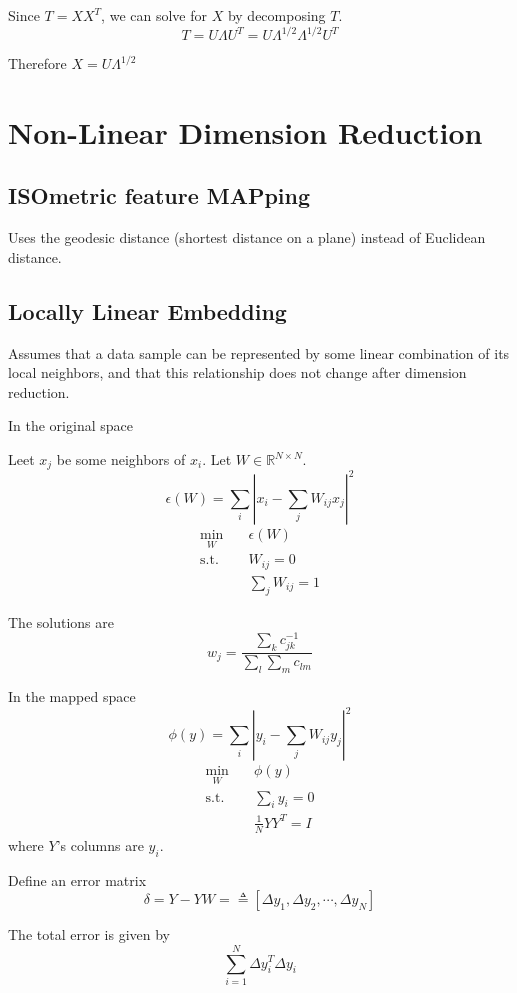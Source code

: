    Since $T=XX^T$, we can solve for $X$ by decomposing $T$.
    \[T = U\Lambda U^T = U\Lambda^{1/2}\Lambda^{1/2}U^T\]

    Therefore $X=U\Lambda^{1/2}$


\section{Non-Linear Dimension Reduction}
    \subsection{ISOmetric feature MAPping}
        Uses the geodesic distance (shortest distance on a plane) instead of Euclidean distance.

    \subsection{Locally Linear Embedding}
        Assumes that a data sample can be represented by some linear combination of its local neighbors, and that this relationship does not change after dimension reduction.

        In the original space

        Leet $x_j$ be some neighbors of $x_i$. Let $W \in \mathbb{R}^{N \times N}$.
        \[ \epsilon(W) = \sum_i \left|x_i - \sum_jW_{ij}x_j\right|^2 \]
        \begin{align*}
            \min_W &\quad \epsilon(W)\\
            \text{s.t.} &\quad W_{ij} = 0\\
            &\quad \sum_j W_{ij}=1
        \end{align*}

        The solutions are
        \[ w_j = \frac{\sum_k c^{-1}_{jk}}{\sum_l\sum_m c_{lm}} \]

        In the mapped space
        \[ \phi(y) = \sum_i\left| y_i - \sum_j W_{ij}y_j \right|^2 \]
        \begin{align*}
            \min_W &\quad \phi(y)\\
            \text{s.t.} &\quad \sum_i y_i = 0\\
            &\quad \frac{1}{N} YY^T = I
        \end{align*}
        where $Y$'s columns are $y_i$.

        Define an error matrix
        \[ \delta = Y-YW = \triangleq [\Delta y_1,\Delta y_2,\cdots,\Delta y_N]\]

        The total error is given by
        \[ \sum_{i=1}^N \Delta y_i^T \Delta y_i \]

